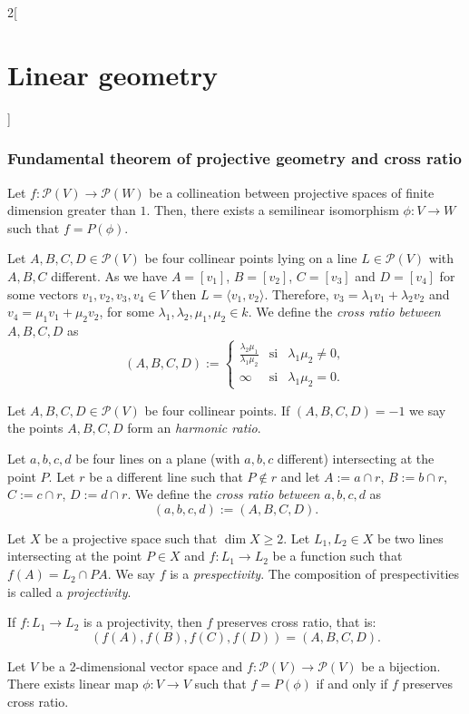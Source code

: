 \documentclass[../../../main.tex]{subfiles}
\begin{document}
\begin{multicols}{2}[\section{Linear geometry}]
\subsubsection*{Fundamental theorem of projective geometry and cross ratio}
\begin{theorem}
Let $f:\mathcal{P}(V)\rightarrow \mathcal{P}(W)$ be a collineation between projective spaces of finite dimension greater than $1$. Then, there exists a semilinear isomorphism $\phi:V\rightarrow W$ such that $f=P(\phi)$.
\end{theorem}
\begin{definition}
Let $A,B,C,D\in\mathcal{P}(V)$ be four collinear points lying on a line $L\in\mathcal{P}(V)$ with $A,B,C$ different. As we have $A=[v_1]$, $B=[v_2]$, $C=[v_3]$ and $D=[v_4]$ for some vectors $v_1,v_2,v_3,v_4\in V$ then $L=\langle v_1,v_2\rangle$. Therefore, $v_3=\lambda_1v_1+\lambda_2v_2$ and $v_4=\mu_1v_1+\mu_2v_2$, for some $\lambda_1,\lambda_2,\mu_1,\mu_2\in k$. We define the \textit{cross ratio between $A,B,C,D$} as $$(A,B,C,D):=\left\{\begin{array}{ccc}
    \displaystyle\frac{\lambda_2\mu_1}{\lambda_1\mu_2} & \text{si} & \lambda_1\mu_2\ne0, \\
    \infty & \text{si} & \lambda_1\mu_2=0.
\end{array}\right.$$ 
\end{definition}
\begin{definition}
Let $A,B,C,D\in\mathcal{P}(V)$ be four collinear points. If $(A,B,C,D)=-1$ we say the points $A,B,C,D$ form an \textit{harmonic ratio}.
\end{definition}
\begin{definition}
Let $a,b,c,d$ be four lines on a plane (with $a,b,c$ different) intersecting at the point $P$. Let $r$ be a different line such that $P\notin r$ and let $A:=a\cap r$, $B:=b\cap r$, $C:=c\cap r$, $D:=d\cap r$. We define the \textit{cross ratio between $a,b,c,d$} as $$(a,b,c,d):=(A,B,C,D).$$
\end{definition}
\begin{definition}
Let $X$ be a projective space such that $\dim X\geq 2$. Let $L_1,L_2\in X$ be two lines intersecting at the point $P\in X$ and $f:L_1\rightarrow L_2$ be a function such that $f(A)=L_2\cap PA$. We say $f$ is a \textit{prespectivity}. The composition of prespectivities is called a \textit{projectivity}.
\end{definition}
\begin{theorem}
If $f:L_1\rightarrow L_2$ is a projectivity, then $f$ preserves cross ratio, that is: $$(f(A),f(B),f(C),f(D))=(A,B,C,D).$$
\end{theorem}
\begin{theorem}
Let $V$ be a 2-dimensional vector space and $f:\mathcal{P}(V)\rightarrow \mathcal{P}(V)$ be a bijection. There exists linear map $\phi:V\rightarrow V$ such that $f=P(\phi)$ if and only if $f$ preserves cross ratio.
\end{theorem}

\end{multicols}
\end{document}
